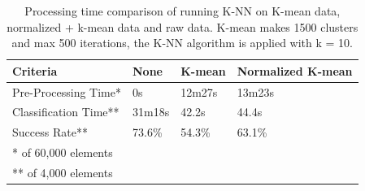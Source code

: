 \begin{table}[H]
\centering
\begin{tabular}{|l|p{2cm}|p{2cm}|p{2cm}|}\hline
Criteria & None & K-mean & Normalized K-mean \\ \hline
Pre-Processing Time* & 0s & 12m27s & 13m23s \\ \hline
Classification Time** & 31m18s & 42.2s & 44.4s \\ \hline
Success Rate** & 73.6\% & 54.3\% & 63.1\% \\ \hline
\multicolumn{4}{|l|}{* of 60,000 elements} \\ 
\multicolumn{4}{|l|}{** of 4,000 elements} \\ \hline
\end{tabular}
\caption{Processing time comparison of running K-NN on K-mean data, normalized + k-mean data and raw data. K-mean makes 1500 clusters and max 500 iterations, the K-NN algorithm is applied with k = 10.}
\label{tab:processingtime_kmean_vs_raw_knn}
\end{table}